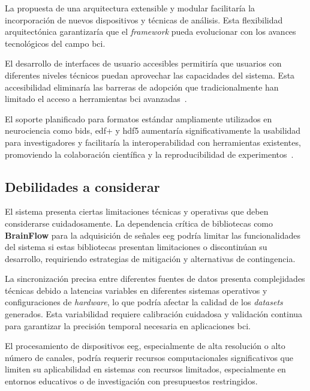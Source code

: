 La propuesta de una arquitectura extensible y modular facilitaría la incorporación de nuevos dispositivos y técnicas de análisis. Esta flexibilidad arquitectónica garantizaría que el \textit{\gls{framework}} pueda evolucionar con los avances tecnológicos del campo \acrshort{bci}.

El desarrollo de interfaces de usuario accesibles permitiría que usuarios con diferentes niveles técnicos puedan aprovechar las capacidades del sistema. Esta accesibilidad eliminaría las barreras de adopción que tradicionalmente han limitado el acceso a herramientas \acrshort{bci} avanzadas~\cite{brunner2013bnci}.

El soporte planificado para formatos estándar ampliamente utilizados en neurociencia como \acrshort{bids}, \acrshort{edf+} y \acrshort{hdf5} aumentaría significativamente la usabilidad para investigadores y facilitaría la interoperabilidad con herramientas existentes, promoviendo la colaboración científica y la reproducibilidad de experimentos~\cite{bids}.

\subsection{Debilidades a considerar}
\label{subsec:debilidades}

El sistema presenta ciertas limitaciones técnicas y operativas que deben considerarse cuidadosamente. La dependencia crítica de bibliotecas como \textbf{BrainFlow} para la adquisición de señales \acrshort{eeg} podría limitar las funcionalidades del sistema si estas bibliotecas presentan limitaciones o discontinúan su desarrollo, requiriendo estrategias de mitigación y alternativas de contingencia.

La sincronización precisa entre diferentes fuentes de datos presenta complejidades técnicas debido a latencias variables en diferentes sistemas operativos y configuraciones de \textit{hardware}, lo que podría afectar la calidad de los \textit{\glspl{dataset}} generados. Esta variabilidad requiere calibración cuidadosa y validación continua para garantizar la precisión temporal necesaria en aplicaciones \acrshort{bci}.

El procesamiento de dispositivos \acrshort{eeg}, especialmente de alta resolución o alto número de canales, podría requerir recursos computacionales significativos que limiten su aplicabilidad en sistemas con recursos limitados, especialmente en entornos educativos o de investigación con presupuestos restringidos.

